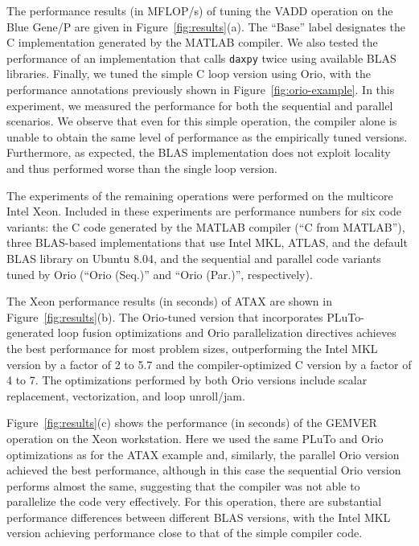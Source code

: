 \documentclass[runningheads]{llncs}
\begin{document}
The performance results (in MFLOP/s) of tuning the VADD operation on the Blue
Gene/P are given in Figure~\ref{fig:results}(a). The ``Base'' label
designates the C implementation generated by the MATLAB compiler. We also
tested the performance of an implementation that calls
\texttt{daxpy} twice using available BLAS libraries.
Finally, we tuned the simple C loop version using Orio, with the performance
annotations previously shown in Figure~\ref{fig:orio-example}. In this
experiment, we measured the performance for both the sequential and parallel
scenarios. We observe that even for this simple operation, the compiler alone
is unable to obtain the same level of performance as the empirically tuned
versions. Furthermore, as expected, the BLAS implementation does not
exploit locality and thus performed worse than the single loop version.

The experiments of the remaining operations were performed on the
multicore Intel Xeon. Included in these experiments are performance
numbers for six code variants: the C code generated by the MATLAB
compiler (``C from MATLAB''), three BLAS-based implementations that
use Intel MKL, ATLAS, and the default BLAS library on Ubuntu 8.04, and
the sequential and parallel code variants tuned by Orio (``Orio
(Seq.)'' and ``Orio (Par.)'', respectively).

The Xeon performance results (in seconds) of ATAX are shown in
Figure~\ref{fig:results}(b). The Orio-tuned version that incorporates
PLuTo-generated loop fusion optimizations and Orio parallelization
directives achieves the best performance for most problem sizes,
outperforming the Intel MKL version by a factor of 2 to 5.7 and the
compiler-optimized C version by a factor of 4 to 7. The optimizations
performed by both Orio versions include scalar replacement,
vectorization, and loop unroll/jam.

Figure~\ref{fig:results}(c) shows the performance (in seconds) of the GEMVER
operation on the Xeon workstation. Here we used the same PLuTo and Orio
optimizations as for the ATAX example and, similarly, the parallel Orio
version achieved the best performance, although in this case the sequential
Orio version performs almost the same, suggesting that the compiler was not
able to parallelize the code very effectively. For this operation, there are
substantial performance differences between different BLAS versions, with the
Intel MKL version achieving performance close to that of the simple compiler
code.
\end{document}
